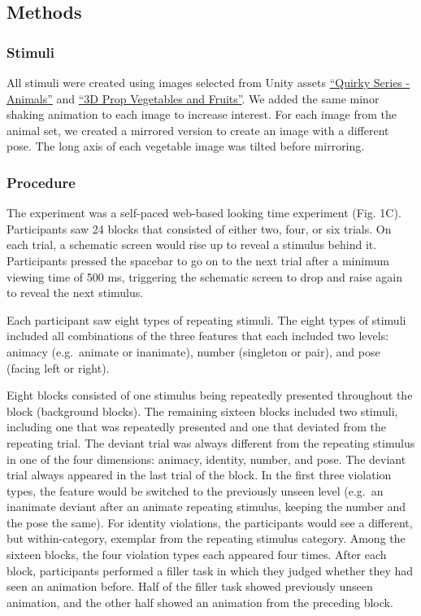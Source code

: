 \documentclass[10pt, letterpaper]{article}
\begin{document}
\hypertarget{methods}{%
\subsection{Methods}\label{methods}}

\hypertarget{stimuli}{%
\subsubsection{Stimuli}\label{stimuli}}

All stimuli were created using images selected from Unity assets
\href{https://assetstore.unity.com/packages/3d/characters/animals/quirky-series-animals-mega-pack-vol-2-183280}{``Quirky
Series - Animals''} and
\href{https://assetstore.unity.com/packages/3d/props/food/3d-prop-vegetables-and-fruits-237790}{``3D
Prop Vegetables and Fruits''}. We added the same minor shaking animation
to each image to increase interest. For each image from the animal set,
we created a mirrored version to create an image with a different pose.
The long axis of each vegetable image was tilted before mirroring.

\hypertarget{procedure}{%
\subsubsection{Procedure}\label{procedure}}

The experiment was a self-paced web-based looking time experiment (Fig.
1C). Participants saw 24 blocks that consisted of either two, four, or
six trials. On each trial, a schematic screen would rise up to reveal a
stimulus behind it. Participants pressed the spacebar to go on to the
next trial after a minimum viewing time of 500 ms, triggering the
schematic screen to drop and raise again to reveal the next stimulus.

Each participant saw eight types of repeating stimuli. The eight types
of stimuli included all combinations of the three features that each
included two levels: animacy (e.g.~animate or inanimate), number
(singleton or pair), and pose (facing left or right).

Eight blocks consisted of one stimulus being repeatedly presented
throughout the block (background blocks). The remaining sixteen blocks
included two stimuli, including one that was repeatedly presented and
one that deviated from the repeating trial. The deviant trial was always
different from the repeating stimulus in one of the four dimensions:
animacy, identity, number, and pose. The deviant trial always appeared
in the last trial of the block. In the first three violation types, the
feature would be switched to the previously unseen level (e.g.~an
inanimate deviant after an animate repeating stimulus, keeping the
number and the pose the same). For identity violations, the participants
would see a different, but within-category, exemplar from the repeating
stimulus category. Among the sixteen blocks, the four violation types
each appeared four times. After each block, participants performed a
filler task in which they judged whether they had seen an animation
before. Half of the filler task showed previously unseen animation, and
the other half showed an animation from the preceding block.
\end{document}
